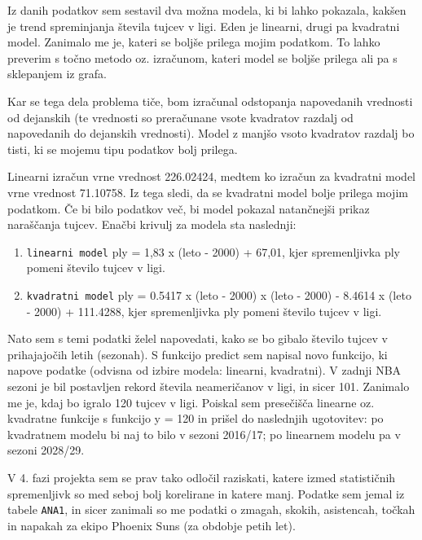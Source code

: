 \documentclass[11pt,a4paper]{article}
\begin{document}
Iz danih podatkov sem sestavil dva možna modela, ki bi lahko pokazala, kakšen je trend spreminjanja števila tujcev v ligi. Eden je linearni, drugi pa kvadratni model. Zanimalo me je, kateri se boljše prilega mojim podatkom. 
To lahko preverim s točno metodo oz. izračunom, kateri model se boljše prilega ali pa s sklepanjem iz grafa.

\smallskip

Kar se tega dela problema tiče, bom izračunal odstopanja napovedanih vrednosti od dejanskih (te vrednosti so preračunane vsote kvadratov razdalj od napovedanih do dejanskih vrednosti). Model z manjšo vsoto kvadratov razdalj bo tisti, ki se mojemu tipu podatkov bolj prilega.

\smallskip

Linearni izračun vrne vrednost 226.02424, medtem ko izračun za kvadratni model vrne vrednost 71.10758. Iz tega sledi, da se kvadratni model bolje prilega mojim podatkom. Če bi bilo podatkov več, bi model pokazal natančnejši prikaz naraščanja tujcev. 
Enačbi krivulj za modela sta naslednji:
\begin{enumerate}
\item{\verb|linearni model| ply = 1,83 x (leto - 2000) + 67,01, kjer spremenljivka ply pomeni število tujcev v ligi.}
\item{\verb|kvadratni model| ply = 0.5417 x (leto - 2000) x (leto - 2000) - 8.4614 x (leto - 2000) + 111.4288, kjer spremenljivka ply pomeni število tujcev v ligi.}
\end{enumerate}

\smallskip


Nato sem s temi podatki želel napovedati, kako se bo gibalo število tujcev v prihajajočih letih (sezonah). S funkcijo predict sem napisal novo funkcijo, ki napove podatke (odvisna od izbire modela: linearni, kvadratni). V zadnji NBA sezoni je bil postavljen rekord števila neameričanov v ligi, in sicer 101. Zanimalo me je, kdaj bo igralo 120 tujcev v ligi. Poiskal sem presečišča linearne oz. kvadratne funkcije s funkcijo y = 120 in prišel do naslednjih ugotovitev: po kvadratnem modelu bi naj to bilo v sezoni 2016/17;
po linearnem modelu pa v sezoni 2028/29.

\smallskip


\newpage
V 4. fazi projekta sem se prav tako odločil raziskati, katere izmed statističnih spremenljivk so med seboj bolj korelirane in katere manj. Podatke sem jemal iz tabele \verb|ANA1|, in sicer zanimali so me podatki o zmagah, skokih, asistencah, točkah in napakah za ekipo Phoenix Suns (za obdobje petih let).
\end{document}
